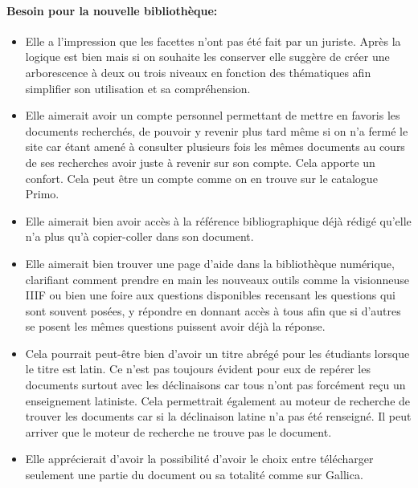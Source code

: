 \paragraph*{Besoin pour la nouvelle bibliothèque:}
\begin{itemize}
	\item Elle a l’impression que les facettes n’ont pas été fait par un juriste. Après la logique est bien mais si on souhaite les conserver elle suggère de créer une arborescence à deux ou trois niveaux en fonction des thématiques afin simplifier son utilisation et sa compréhension.
\item Elle aimerait avoir un compte personnel permettant de mettre en favoris les documents recherchés, de pouvoir y revenir plus tard même si on n’a fermé le site car étant amené à consulter plusieurs fois les mêmes documents au cours de ses recherches avoir juste à revenir sur son compte. Cela apporte un confort. Cela peut être un compte comme on en trouve sur le catalogue Primo.
\item Elle aimerait bien avoir accès à la référence bibliographique déjà rédigé qu’elle n’a plus qu’à copier-coller dans son document.
\item Elle aimerait bien trouver une page d’aide dans la bibliothèque numérique, clarifiant comment prendre en main les nouveaux outils comme la visionneuse IIIF ou bien une foire aux questions disponibles recensant les questions qui sont souvent posées, y répondre en donnant accès à tous afin que si d’autres se posent les mêmes questions puissent avoir déjà la réponse.
\item Cela pourrait peut-être bien d’avoir un titre abrégé pour les étudiants lorsque le titre est latin. Ce n’est pas toujours évident pour eux de repérer les documents surtout avec les déclinaisons car tous n’ont pas forcément reçu un enseignement latiniste. Cela permettrait également au moteur de recherche de trouver les documents car si la déclinaison latine n’a pas été renseigné. Il peut arriver que le moteur de recherche ne trouve pas le document.
\item Elle apprécierait d’avoir la possibilité d’avoir le choix entre télécharger seulement une partie du document ou sa totalité comme sur Gallica.
\end{itemize}
